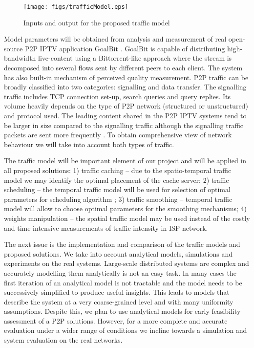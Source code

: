 \documentclass[10pt, conference, compsocconf]{IEEEtran}
\begin{document}
\begin{figure}[!t]
\centering
\texttt{[image: figs/trafficModel.eps]}
\caption{Inputs and output for the proposed traffic model}
\label{fig:trafficModel}
\end{figure}
Model parameters will be obtained from analysis and measurement of real open-source P2P IPTV application GoalBit \cite{bertinat_goalbit:first_2009}⁠. GoalBit is capable of distributing high-bandwidth live-content using a Bittorrent-like approach where the stream is decomposed into several flows sent by different peers to each client. The system has also built-in mechanism of perceived quality measurement.
P2P traffic can be broadly classified into two categories: signalling and data transfer. The signalling traffic includes TCP connection set-up, search queries and query replies. Its volume heavily depends on the type of P2P network (structured or unstructured) and protocol used. The leading content shared in the P2P IPTV systems tend to be larger in size compared to the signalling traffic although the signalling traffic packets are sent more frequently \cite{silverston_traffic_2009}⁠. To obtain comprehensive view of network behaviour we will take into account both types of traffic. 

The traffic model will be important element of our project and will be applied in all proposed solutions: 1) traffic caching -- due to the spatio-temporal traffic model we may identify the optimal placement of the cache server; 2) traffic scheduling -- the temporal traffic model will be used for selection of optimal parameters for scheduling algorithm \cite{lazar_modeling_1994}⁠; 3) traffic smoothing -- temporal traffic model will allow to choose optimal parameters for the smoothing mechanisms; 4) weights manipulation -- the spatial traffic model may be used instead of the costly and time intensive measurements of traffic intensity in ISP network.

The next issue is the implementation and comparison of the traffic models and proposed solutions. We take into account analytical models, simulations and experiments on the real systems. Large-scale distributed systems are complex and accurately modelling them analytically is not an easy task. In many cases the first iteration of an analytical model is not tractable and the model needs to be successively simplified to produce useful insights. This leads to models that describe the system at a very coarse-grained level and with many uniformity assumptions. Despite this, we plan to use analytical models for early feasibility assessment of a P2P solutions. However, for a more complete and accurate evaluation under a wider range of conditions we incline towards a simulation and system evaluation on the real networks. 
\end{document}
